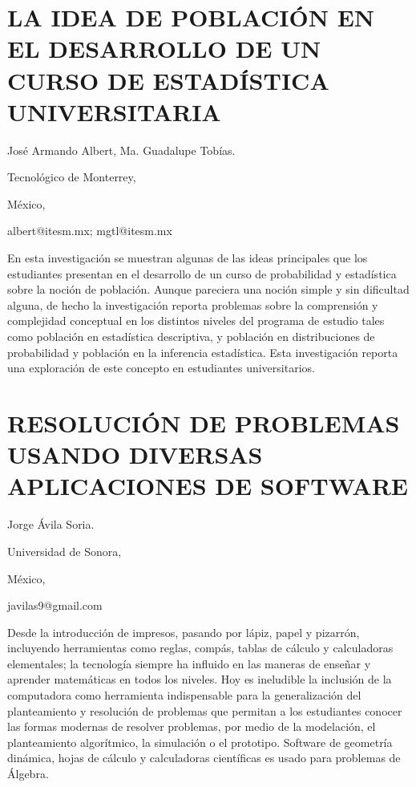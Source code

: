 \section{LA IDEA DE POBLACIÓN EN EL DESARROLLO DE UN CURSO DE ESTADÍSTICA
UNIVERSITARIA}

\begin{datos}

José Armando Albert, Ma. Guadalupe Tobías.

Tecnológico de Monterrey, 

México,

albert@itesm.mx; mgtl@itesm.mx

\end{datos}

En esta investigación se muestran algunas de las ideas principales
que los estudiantes presentan en el desarrollo de un curso de probabilidad
y estadística sobre la noción de población. Aunque pareciera una noción
simple y sin dificultad alguna, de hecho la investigación reporta
problemas sobre la comprensión y complejidad conceptual en los distintos
niveles del programa de estudio tales como población en estadística
descriptiva, y población en distribuciones de probabilidad y población
en la inferencia estadística. Esta investigación reporta una exploración
de este concepto en estudiantes universitarios.

\setcounter{section}{248}


\section{RESOLUCIÓN DE PROBLEMAS USANDO DIVERSAS APLICACIONES DE SOFTWARE}

\begin{datos}

Jorge Ávila Soria.

Universidad de Sonora,

México,

javilas9@gmail.com

\end{datos}

Desde la introducción de impresos, pasando por lápiz, papel y pizarrón,
incluyendo herramientas como reglas, compás, tablas de cálculo y calculadoras
elementales; la tecnología siempre ha influido en las maneras de enseñar
y aprender matemáticas en todos los niveles. Hoy es ineludible la
inclusión de la computadora como herramienta indispensable para la
generalización del planteamiento y resolución de problemas que permitan
a los estudiantes conocer las formas modernas de resolver problemas,
por medio de la modelación, el planteamiento algorítmico, la simulación
o el prototipo. Software de geometría dinámica, hojas de cálculo y
calculadoras científicas es usado para problemas de Álgebra.


